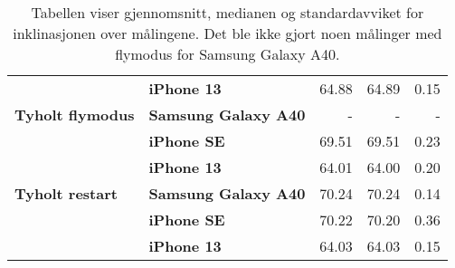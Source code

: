 \begin{table}[]
\begin{tabular}{llrrr}
                                            & \textbf{iPhone 13}                      & 64.88                                                                       & 64.89                                                                 & 0.15                                                                         \\
    \textbf{Tyholt flymodus}                & \textbf{Samsung Galaxy A40}                       & -                                                                           & -                                                                     & -                                                                            \\
                                            & \textbf{iPhone SE}                   & 69.51                                                                       & 69.51                                                                 & 0.23                                                                         \\
                                            & \textbf{iPhone 13}                      & 64.01                                                                       & 64.00                                                                 & 0.20                                                                         \\
    \rowcolor[HTML]{C0C0C0} 
    \textbf{Tyholt restart}                 & \textbf{Samsung Galaxy A40}                       & 70.24                                                                       & 70.24                                                                 & 0.14                                                                         \\
    \rowcolor[HTML]{C0C0C0} 
                                            & \textbf{iPhone SE}                   & 70.22                                                                       & 70.20                                                                 & 0.36                                                                         \\
    \rowcolor[HTML]{C0C0C0} 
                                            & \textbf{iPhone 13}                      & 64.03                                                                       & 64.03                                                                 & 0.15                                                                        
    \end{tabular}
    \caption{Tabellen viser gjennomsnitt, medianen og standardavviket for inklinasjonen over målingene. Det ble ikke gjort noen målinger med flymodus for Samsung Galaxy A40.}
\end{table}